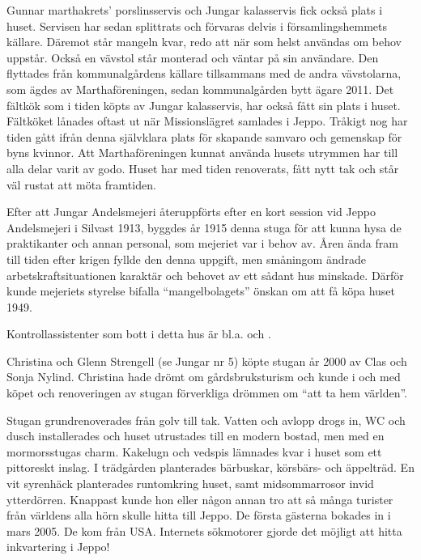 Gunnar marthakrets' porslinsservis och Jungar kalasservis fick också plats i huset. Servisen har sedan splittrats och förvaras delvis i församlingshemmets källare. Däremot står mangeln kvar, redo att när som helst användas om behov uppstår. Också en vävstol står monterad och väntar på sin användare. Den flyttades från kommunalgårdens källare tillsammans med de andra vävstolarna, som ägdes av Marthaföreningen, sedan kommunalgården bytt ägare 2011. Det fältkök som i tiden köpts av Jungar kalasservis, har också fått sin plats i huset. Fältköket lånades oftast ut när Missionslägret samlades i Jeppo. Tråkigt nog har tiden gått ifrån denna självklara plats för skapande samvaro och gemenskap för byns kvinnor. Att Marthaföreningen kunnat använda husets utrymmen har till alla delar varit av godo. Huset har med tiden renoverats, fått nytt tak och står väl rustat att möta framtiden.


%
Efter att Jungar Andelsmejeri återuppförts efter en kort session vid Jeppo Andelsmejeri i Silvast 1913, byggdes år 1915 denna stuga för att kunna hysa de praktikanter och annan personal, som mejeriet var i behov av. Åren ända fram till tiden efter krigen fyllde den denna uppgift, men småningom ändrade arbetskraftsituationen karaktär och behovet av ett sådant hus minskade. Därför kunde mejeriets styrelse bifalla ``mangelbolagets'' önskan om att få köpa huset 1949.

Kontrollassistenter som bott i detta hus är bl.a.  och .



%



%
Christina och Glenn Strengell (se Jungar nr 5) köpte stugan år 2000 av Clas och Sonja Nylind. Christina hade drömt om gårdsbruksturism och kunde i och med köpet och renoveringen av stugan förverkliga drömmen om ``att ta hem världen''.

Stugan grundrenoverades från golv till tak. Vatten och avlopp drogs in, WC och dusch installerades och huset utrustades till en modern bostad, men med en mormorsstugas charm. Kakelugn och vedspis lämnades kvar i huset som ett pittoreskt inslag. I trädgården planterades bärbuskar, körsbärs- och äppelträd. En vit syrenhäck planterades runtomkring huset, samt midsommarrosor invid ytterdörren. Knappast kunde hon eller någon annan tro att så många turister från världens alla hörn skulle hitta till Jeppo. De första gästerna bokades in i mars 2005. De kom från USA. Internets sökmotorer gjorde det möjligt att hitta inkvartering i Jeppo!

